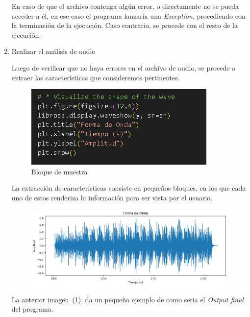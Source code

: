 \documentclass[letterpaper, 12pt]{article}
\begin{document}
\begin{enumerate}
	      En caso de que el archivo contenga algún error, o
	      directamente no se pueda acceder a él, en ese caso el
	      programa lanzaría una \textit{Exception}, procediendo con
	      la terminación de la ejecución. Caso contrario, se procede
	      con el resto de la ejecución.

	\item Realizar el análisis de audio

	      Luego de verificar que no haya errores en el archivo de
	      audio, se procede a extraer las características que
	      consideremos pertinentes.

	      \begin{figure}
		      \begin{center}
			      \includegraphics[width=.7\linewidth]{./Images/AudioAnalysisSample_1.PNG}
			      \caption{Bloque de muestra}
		      \end{center}
	      \end{figure}

	      La extracción de características consiste en pequeños
	      bloques, en los que cada uno de estos renderiza la
	      información para ser vista por el usuario.

	      \begin{figure}[H]
		      \begin{center}
			      \includegraphics[width=.7\linewidth]{./Images/SampleRunImage_1.png}
			      \caption{}
			      \label{figure:sample_run_image_1}
		      \end{center}
	      \end{figure}

	      La anterior imagen~(\ref{figure:sample_run_image_1}), da un
	      pequeño ejemplo de como seria el \textit{Output final} del
	      programa.
\end{enumerate}
\end{document}
